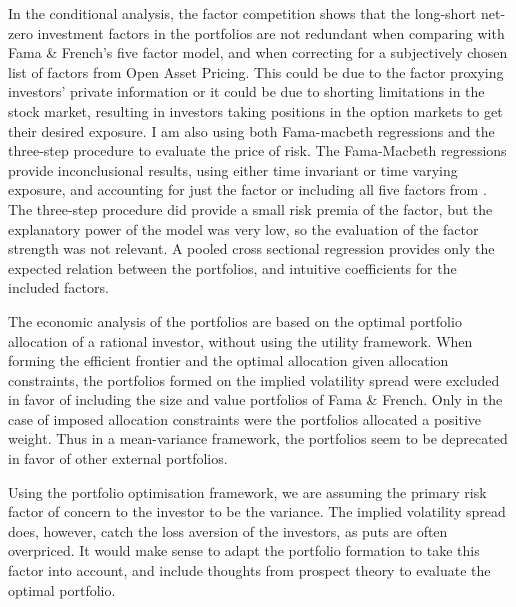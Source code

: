 In the conditional analysis, the factor competition shows that the long-short net-zero investment factors in the portfolios are not redundant when comparing with Fama \& French's five factor model, and when correcting for a subjectively chosen list of factors from Open Asset Pricing. This could be due to the factor proxying investors' private information or it could be due to shorting limitations in the stock market, resulting in investors taking positions in the option markets to get their desired exposure.
I am also using both Fama-macbeth regressions and the three-step procedure to evaluate the price of risk. The Fama-Macbeth regressions provide inconclusional results, using either time invariant or time varying exposure, and accounting for just the factor or including all five factors from \cite{fama2015five}. The three-step procedure did provide a small risk premia of the factor, but the explanatory power of the model was very low, so the evaluation of the factor strength was not relevant. 
A pooled cross sectional regression provides only the expected relation between the portfolios, and intuitive coefficients for the included factors. 

The economic analysis of the portfolios are based on the optimal portfolio allocation of a rational investor, without using the utility framework. When forming the efficient frontier and the optimal allocation given allocation constraints, the portfolios formed on the implied volatility spread were excluded in favor of including the size and value portfolios of Fama \& French. Only in the case of imposed allocation constraints were the portfolios allocated a positive weight. Thus in a mean-variance framework, the portfolios seem to be deprecated in favor of other external portfolios.

Using the portfolio optimisation framework, we are assuming the primary risk factor of concern to the investor to be the variance. The implied volatility spread does, however, catch the loss aversion of the investors, as puts are often overpriced. It would make sense to adapt the portfolio formation to take this factor into account, and include thoughts from prospect theory to evaluate the optimal portfolio.

